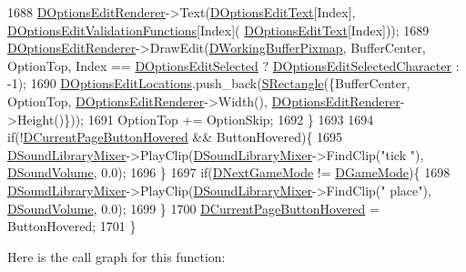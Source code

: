 \begin{DoxyCode}
1688         \hyperlink{classCApplicationData_ad445b9a4d742414d09196de7cd8a5b26}{DOptionsEditRenderer}->Text(\hyperlink{classCApplicationData_a7044dc34cbd9d6776e8ef79eb12b5ce4}{DOptionsEditText}[Index], 
      \hyperlink{classCApplicationData_ab76fa444142de66fdb058f390e01112c}{DOptionsEditValidationFunctions}[Index](
      \hyperlink{classCApplicationData_a7044dc34cbd9d6776e8ef79eb12b5ce4}{DOptionsEditText}[Index]));
1689         \hyperlink{classCApplicationData_ad445b9a4d742414d09196de7cd8a5b26}{DOptionsEditRenderer}->DrawEdit(\hyperlink{classCApplicationData_afa34cf2780f38dd28c0c811e69d60a97}{DWorkingBufferPixmap}, 
      BufferCenter, OptionTop, Index == \hyperlink{classCApplicationData_aee4aa5eb5b89b86eb2648d0f9c7358f9}{DOptionsEditSelected} ? 
      \hyperlink{classCApplicationData_a921d69021fc61e51d12d8a26a5ac1a89}{DOptionsEditSelectedCharacter} : -1);
1690         \hyperlink{classCApplicationData_ab4e6804c6e50cca45ab3c3071588da34}{DOptionsEditLocations}.push\_back(\hyperlink{structSRectangle}{SRectangle}(\{BufferCenter, OptionTop,
       \hyperlink{classCApplicationData_ad445b9a4d742414d09196de7cd8a5b26}{DOptionsEditRenderer}->Width(), \hyperlink{classCApplicationData_ad445b9a4d742414d09196de7cd8a5b26}{DOptionsEditRenderer}->Height()\}));
1691         OptionTop += OptionSkip;
1692     \}
1693     
1694     \textcolor{keywordflow}{if}(!\hyperlink{classCApplicationData_a96b3a9b5c9965540007dff3fa85587fa}{DCurrentPageButtonHovered} && ButtonHovered)\{
1695         \hyperlink{classCApplicationData_aa1e6876121bb4fb229ec6b930a8a6766}{DSoundLibraryMixer}->PlayClip(\hyperlink{classCApplicationData_aa1e6876121bb4fb229ec6b930a8a6766}{DSoundLibraryMixer}->FindClip(\textcolor{stringliteral}{"tick
      "}), \hyperlink{classCApplicationData_aa6e540f860dcb1929ef36ddce3be3691}{DSoundVolume}, 0.0);
1696     \}
1697     \textcolor{keywordflow}{if}(\hyperlink{classCApplicationData_a3b67edeacd70201dcf96fa9fa8aa2107}{DNextGameMode} != \hyperlink{classCApplicationData_a2f906f2b4208ecb2a057e6b62e549685}{DGameMode})\{
1698         \hyperlink{classCApplicationData_aa1e6876121bb4fb229ec6b930a8a6766}{DSoundLibraryMixer}->PlayClip(\hyperlink{classCApplicationData_aa1e6876121bb4fb229ec6b930a8a6766}{DSoundLibraryMixer}->FindClip(\textcolor{stringliteral}{"
      place"}), \hyperlink{classCApplicationData_aa6e540f860dcb1929ef36ddce3be3691}{DSoundVolume}, 0.0);
1699     \}
1700     \hyperlink{classCApplicationData_a96b3a9b5c9965540007dff3fa85587fa}{DCurrentPageButtonHovered} = ButtonHovered;
1701 \}
\end{DoxyCode}
Here is the call graph for this function\+:\nopagebreak
